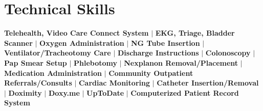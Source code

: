 \documentclass[letterpaper,11pt]{article}
\begin{document}
\section{Technical Skills}
 \begin{itemize}[leftmargin=0.15in, label={}]
    \small{\item{
    \textbf{Telehealth, Video Care Connect System }
    $|$\textbf{ EKG, Triage, Bladder Scanner }
    $|$\textbf{ Oxygen Administration }
    $|$\textbf{ NG Tube Insertion }
    $|$\textbf{ Ventilator/Tracheotomy Care }
    $|$\textbf{ Discharge Instructions }
    $|$\textbf{ Colonoscopy }
    $|$ \textbf{ Pap Smear Setup }
    $|$ \textbf{ Phlebotomy }
    $|$ \textbf{ Nexplanon Removal/Placement }
    $|$ \textbf{ Medication Administration }
    $|$ \textbf{ Community Outpatient Referrals/Consults }
    $|$ \textbf{ Cardiac Monitoring }
    $|$ \textbf{ Catheter Insertion/Removal }
     $|$ \textbf{ Doximity }
     $|$ \textbf{ Doxy.me }
     $|$ \textbf{ UpToDate }
     $|$ \textbf{ Computerized Patient Record System }
     }}
 \end{itemize}
\end{document}
